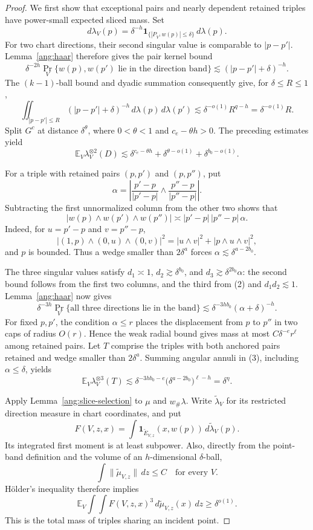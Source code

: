 \begin{proof}
We first show that exceptional pairs and nearly dependent retained triples have power-small expected sliced mass. Set
\[
 d\lambda_V(p)=\delta^{-h}
 \mathbf1_{\{|P_{V^\perp}w(p)|\le\delta\}}\,d\lambda(p).
\]
For two chart directions, their second singular value is comparable to
$|p-p'|$. Lemma~\ref{ang:haar} therefore gives the pair kernel bound
\[
 \delta^{-2h}\Pr_V\{w(p),w(p')\text{ lie in the direction band}\}
 \lesssim (|p-p'|+\delta)^{-h}.
\]
The $(k-1)$-ball bound and dyadic summation consequently give, for
$\delta\le R\le1$,
\[
 \iint_{|p-p'|\le R}(|p-p'|+\delta)^{-h}
 \,d\lambda(p)\,d\lambda(p')
 \lesssim\delta^{-o(1)}R^{q-h}
 =\delta^{-o(1)}R.
\]
Split $G^c$ at distance $\delta^\theta$, where $0<\theta<1$ and
$c_e-\theta h>0$. The preceding estimates yield
\[
 \mathbb E_V\lambda_V^{\otimes2}(D)
 \lesssim
 \delta^{c_e-\theta h}
 +\delta^{\theta-o(1)}
 +\delta^{b_0-o(1)}.
 \tag{1}
\]

For a triple with retained pairs $(p,p')$ and $(p,p'')$, put
\[
 \alpha=\left|
 \frac{p'-p}{|p'-p|}\wedge
 \frac{p''-p}{|p''-p|}
 \right|.
\]
Subtracting the first unnormalized column from the other two shows that
\[
 |w(p)\wedge w(p')\wedge w(p'')|
 \asymp |p'-p|\,|p''-p|\,\alpha.
 \tag{2}
\]
Indeed, for $u=p'-p$ and $v=p''-p$,
\[
 |(1,p)\wedge(0,u)\wedge(0,v)|^2
 =|u\wedge v|^2+|p\wedge u\wedge v|^2,
\]
and $p$ is bounded. Thus a wedge smaller than $2\delta^a$ forces
$\alpha\lesssim\delta^{a-2b_0}$.

The three singular values satisfy
$d_1\asymp1$, $d_2\gtrsim\delta^{b_0}$, and
$d_3\gtrsim\delta^{2b_0}\alpha$: the second bound follows from the first two columns, and the third from (2) and $d_1d_2\lesssim1$.
Lemma~\ref{ang:haar} now gives
\[
 \delta^{-3h}\Pr_V\{\text{all three directions lie in the band}\}
 \lesssim\delta^{-3hb_0}(\alpha+\delta)^{-h}.
 \tag{3}
\]
For fixed $p,p'$, the condition $\alpha\le r$ places the displacement from $p$ to $p''$ in two caps of radius $O(r)$. Hence the weak radial bound gives mass at most $C\delta^{-e}r^\ell$ among retained pairs.
Let $T$ comprise the triples with both anchored pairs retained and wedge smaller than $2\delta^a$. Summing angular annuli in (3), including $\alpha\le\delta$, yields
\[
 \mathbb E_V\lambda_V^{\otimes3}(T)
 \lesssim
 \delta^{-3hb_0-e}
 \bigl(\delta^{a-2b_0}\bigr)^{\ell-h}
 =\delta^\eta.
 \tag{4}
\]

Apply Lemma~\ref{ang:slice-selection} to $\mu$ and $w_\#\lambda$.
Write $\widetilde\lambda_V$ for its restricted direction measure in chart coordinates, and put
\[
 F(V,z,x)=
 \int\mathbf1_{\widetilde E_{V,z}}(x,w(p))\,
 d\widetilde\lambda_V(p).
\]
Its integrated first moment is at least subpower. Also, directly from the point-band definition and the volume of an $h$-dimensional $\delta$-ball,
\[
 \int\|\widetilde\mu_{V,z}\|\,dz\le C
 \quad\text{for every }V.
 \tag{5}
\]
Hölder's inequality therefore implies
\[
 \mathbb E_V\int\!\int F(V,z,x)^3
 \,d\widetilde\mu_{V,z}(x)\,dz\ge\delta^{o(1)}.
 \tag{6}
\]
This is the total mass of triples sharing an incident point.


\end{proof}
